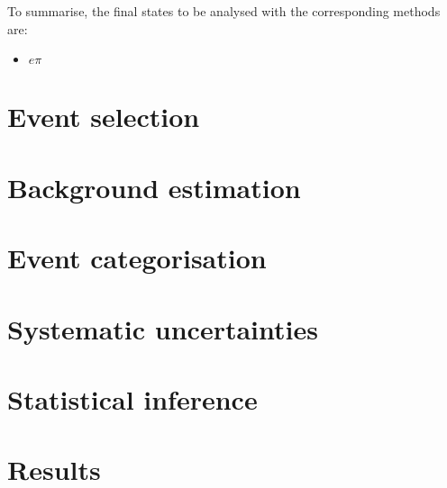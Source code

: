 To summarise, the final states to be analysed with the corresponding methods are:
\begin{itemize}
    \item $e\pi$
\end{itemize}


\section{Event selection}\label{sec:selection}

\section{Background estimation}\label{sec:bkgr}

\section{Event categorisation}\label{sec:ml}

\section{Systematic uncertainties}\label{sec:syst}

\section{Statistical inference}\label{sec:stat}

\section{Results}\label{sec:results}

